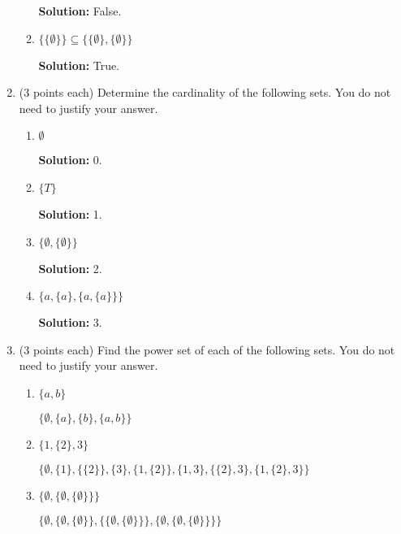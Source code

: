 \documentclass[11pt]{article}
\newcommand{\pte}[1]{\textcolor{maincolor}{(#1 points each)}}
\begin{document}
\begin{justify}
\begin{enumerate}
\begin{enumerate}
\begin{mdframed}
    \textbf{Solution:} False.
\end{mdframed}
\item $\{\{\emptyset\}\} \subseteq \{\{\emptyset\},\{\emptyset\}\}$
\begin{mdframed}
    \textbf{Solution:} True.
\end{mdframed}
\end{enumerate}
\item \pte{3} Determine the cardinality of the following sets. You do not need
to justify your answer.
\begin{enumerate}
\item $\emptyset$
\begin{mdframed}
    \textbf{Solution:} 0.
\end{mdframed}
\item $\{T\}$
\begin{mdframed}
    \textbf{Solution:} 1.
\end{mdframed}
\item $\{\emptyset, \{\emptyset\}\}$
\begin{mdframed}
    \textbf{Solution:} 2.
\end{mdframed}
\item $\{a, \{a\},\{a, \{a\}\}\}$
\begin{mdframed}
    \textbf{Solution:} 3.
\end{mdframed}
\end{enumerate}
\item \pte{3} Find the power set of each of the following sets. You do not need
to justify your answer.
\begin{enumerate}
\item $\{a,b\}$
\begin{mdframed}
    $\{\emptyset, \{a\}, \{b\}, \{a, b\}\}$
\end{mdframed}
\item $\{1, \{2\}, 3\}$
\begin{mdframed}
    $\{\emptyset, \{1\}, \{\{2\}\}, \{3\}, \{1, \{2\}\}, \{1, 3\}, \{\{2\}, 3\}, \{1, \{2\}, 3\}\}$
\end{mdframed}
\item $\{\emptyset, \{\emptyset, \{\emptyset\}\}\}$
\begin{mdframed}
    $\{\emptyset, \{\emptyset, \{\emptyset\}\}, \{\{\emptyset, \{\emptyset\}\}\}, \{\emptyset, \{\emptyset, \{\emptyset\}\}\}\}$
\end{mdframed}
\end{enumerate}     

\end{enumerate}
\end{justify}
\end{document}
